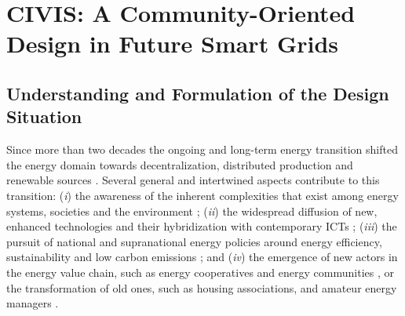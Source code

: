 \section{CIVIS: A Community-Oriented Design in Future Smart Grids}
\label{sec:civis}

% 
% 


\subsection{Understanding and Formulation of the Design Situation}
% 

Since more than two decades the ongoing and long-term energy transition shifted the energy domain
towards decentralization, distributed production and renewable sources \cite{rifkin_third_2011,sovacool_how_2016}. Several general and intertwined aspects contribute to this transition: 
(\textit{i}) the awareness of the inherent complexities that exist among energy systems, societies 
and the environment \cite{bulkeley_bringing_2012,umbach_global_2010}; (\textit{ii}) the
widespread diffusion of new, enhanced technologies and their hybridization with contemporary ICTs 
\cite{putrus_smart_2013,schick_innovating_2013}; (\textit{iii}) the pursuit of national and 
supranational energy policies around energy efficiency, sustainability and low carbon emissions 
\cite{da_graca_carvalho_eu_2012}; and (\textit{iv}) the emergence of new actors in the energy value 
chain, such as energy cooperatives and energy communities \cite{viardot_role_2013}, or the 
transformation of old ones, such as housing associations, and amateur energy managers 
\cite{hasselqvist_linking_2016}.

